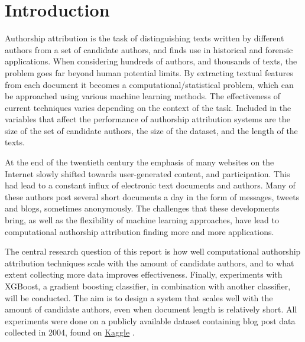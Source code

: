 \section{Introduction}
Authorship attribution is the task of distinguishing texts written by different authors from a set of candidate authors, and finds use in historical and forensic applications.
When considering hundreds of authors, and thousands of texts, the problem goes far beyond human potential limits.
By extracting textual features from each document it becomes a computational/statistical problem, which can be approached using various machine learning methods.
The effectiveness of current techniques varies depending on the context of the task.
Included in the variables that affect the performance of authorship attribution systems are the size of the set of candidate authors, the size of the dataset, and the length of the texts.

At the end of the twentieth century the emphasis of many websites on the Internet slowly shifted towards user-generated content, and participation.
This had lead to a constant influx of electronic text documents and authors.
Many of these authors post several short documents a day in the form of messages, tweets and blogs, sometimes anonymously.
The challenges that these developments bring, as well as the flexibility of machine learning approaches, have lead to computational authorship attribution finding more and more applications.

The central research question of this report is how well computational authorship attribution techniques scale with the amount of candidate authors, and to what extent collecting more data improves effectiveness.
Finally, experiments with XGBoost, a gradient boosting classifier, in combination with another classifier, will be conducted.
The aim is to design a system that scales well with the amount of candidate authors, even when document length is relatively short.
All experiments were done on a publicly available dataset containing blog post data collected in 2004, found on \href{kaggle.com}{Kaggle} .
